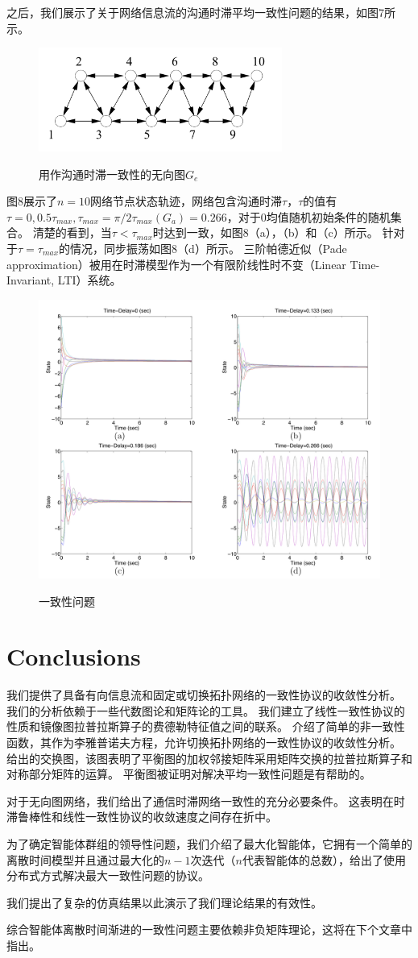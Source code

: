 \documentclass{article}
\begin{document}
之后，我们展示了关于网络信息流的沟通时滞平均一致性问题的结果，如图7所示。
\begin{figure}[htbp]
    \centering
    \includegraphics[width=8cm]{figures/Fig7-Undirected.jpeg}
    \label{Undirected}
    \caption{用作沟通时滞一致性的无向图$G_e$}
\end{figure}

图8展示了$n=10$网络节点状态轨迹，网络包含沟通时滞$\tau$，$\tau$的值有$\tau=0, 0.5\tau_{max}, \tau_{max} = \pi / 2\tau_{max}(G_a) = 0.266$，对于0均值随机初始条件的随机集合。
清楚的看到，当$\tau < \tau_{max}$时达到一致，如图8（a），（b）和（c）所示。
针对于$\tau = \tau_{max}$的情况，同步振荡如图8（d）所示。
三阶帕德近似（Pade approximation）被用在时滞模型作为一个有限阶线性时不变（Linear Time-Invariant, LTI）系统。
\begin{figure}[htbp]
    \centering
    \includegraphics[width=14.5cm]{figures/Fig8-ConsensusProblem.jpeg}
    \label{ConsensusProblem}
    \caption{一致性问题}
\end{figure}


\section{Conclusions}
我们提供了具备有向信息流和固定或切换拓扑网络的一致性协议的收敛性分析。
我们的分析依赖于一些代数图论和矩阵论的工具。
我们建立了线性一致性协议的性质和镜像图拉普拉斯算子的费德勒特征值之间的联系。
介绍了简单的非一致性函数，其作为李雅普诺夫方程，允许切换拓扑网络的一致性协议的收敛性分析。
给出的交换图，该图表明了平衡图的加权邻接矩阵采用矩阵交换的拉普拉斯算子和对称部分矩阵的运算。
平衡图被证明对解决平均一致性问题是有帮助的。

对于无向图网络，我们给出了通信时滞网络一致性的充分必要条件。
这表明在时滞鲁棒性和线性一致性协议的收敛速度之间存在折中。

为了确定智能体群组的领导性问题，我们介绍了最大化智能体，它拥有一个简单的离散时间模型并且通过最大化的$n-1$次迭代（$n$代表智能体的总数），给出了使用分布式方式解决最大一致性问题的协议。

我们提出了复杂的仿真结果以此演示了我们理论结果的有效性。

综合智能体离散时间渐进的一致性问题主要依赖非负矩阵理论，这将在下个文章中指出。
\end{document}
